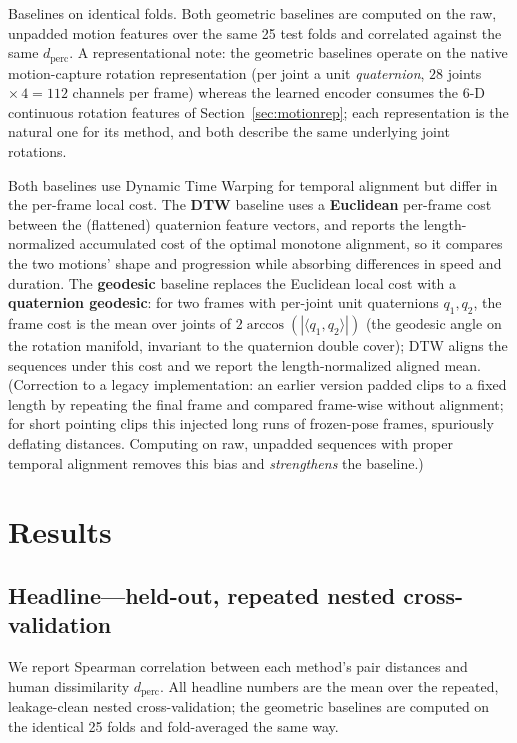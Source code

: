 \documentclass[letterpaper]{article} %
\begin{document}
{Baselines on identical folds.} Both geometric baselines are computed on the {raw,
unpadded} motion features over the {same 25 test folds} and correlated against the same
$d_{\text{perc}}$. A representational note: the geometric baselines operate on the native
motion-capture rotation representation (per joint a unit \emph{quaternion}, $28$ joints
$\times\,4 = 112$ channels per frame) whereas the learned encoder consumes the 6-D continuous
rotation features of Section~\ref{sec:motionrep}; each representation is the natural one for its method, and both
describe the same underlying joint rotations.

Both baselines use Dynamic Time Warping for temporal alignment but differ in the per-frame local
cost. The \textbf{DTW} baseline uses a \textbf{Euclidean} per-frame cost between the (flattened)
quaternion feature vectors, and reports the length-normalized accumulated cost of the optimal
monotone alignment, so it compares the two motions' shape and progression while absorbing
differences in speed and duration. The \textbf{geodesic} baseline replaces the Euclidean local
cost with a \textbf{quaternion geodesic}: for two frames with per-joint unit quaternions $q_1, q_2$,
the frame cost is the mean over joints of $2\arccos(|\langle q_1, q_2\rangle|)$ (the geodesic angle
on the rotation manifold, invariant to the quaternion double cover); DTW aligns the sequences under
this cost and we report the length-normalized aligned mean. ({Correction to a legacy
implementation}: an earlier version padded clips to a fixed length by repeating the final frame and
compared frame-wise without alignment; for short pointing clips this injected long runs of
frozen-pose frames, spuriously deflating distances. Computing on raw, unpadded sequences with
proper temporal alignment removes this bias and \emph{strengthens} the baseline.)

\section{Results}

\subsection{Headline---held-out, repeated nested cross-validation}
We report Spearman correlation between each method's pair distances and human dissimilarity
$d_{\text{perc}}$. All headline numbers are the mean over the repeated, leakage-clean nested
cross-validation; the geometric baselines are computed on the identical 25 folds and fold-averaged
the same way.
\end{document}
